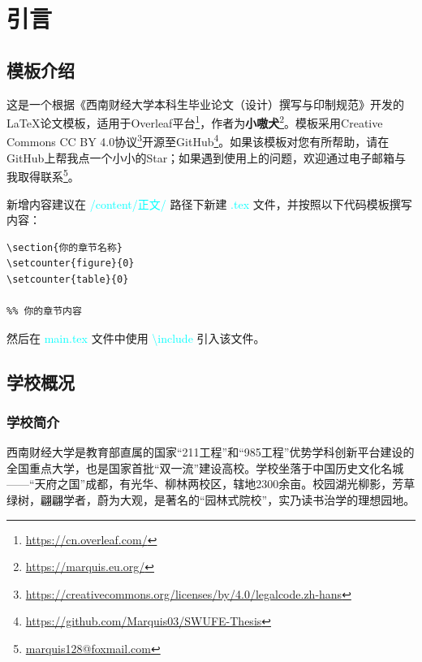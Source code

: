 \setcounter{page}{1}
\section{引言}
\setcounter{figure}{0}
\setcounter{table}{0}

\subsection{模板介绍}

这是一个根据《西南财经大学本科生毕业论文（设计）撰写与印制规范》开发的 \LaTeX 论文模板，适用于Overleaf平台\footnote{\url{https://cn.overleaf.com/}}，作者为\textbf{小嗷犬}\footnote{\url{https://marquis.eu.org/}}。模板采用Creative Commons CC BY 4.0协议\footnote{\url{https://creativecommons.org/licenses/by/4.0/legalcode.zh-hans}}开源至GitHub\footnote{\url{https://github.com/Marquis03/SWUFE-Thesis}}。如果该模板对您有所帮助，请在GitHub上帮我点一个小小的Star；如果遇到使用上的问题，欢迎通过电子邮箱与我取得联系\footnote{\href{mailto:marquis128@foxmail.com}{marquis128@foxmail.com}}。

新增内容建议在 \textcolor{cyan}{/content/正文/} 路径下新建 \textcolor{cyan}{.tex} 文件，并按照以下代码模板撰写内容：

\begin{lstlisting}[language=Tex]
\section{你的章节名称}
\setcounter{figure}{0}
\setcounter{table}{0}

%% 你的章节内容
\end{lstlisting}

然后在 \textcolor{cyan}{main.tex} 文件中使用 \textcolor{cyan}{\textbackslash include} 引入该文件。


\subsection{学校概况}

\subsubsection{学校简介}

西南财经大学是教育部直属的国家“211工程”和“985工程”优势学科创新平台建设的全国重点大学，也是国家首批“双一流”建设高校。学校坐落于中国历史文化名城——“天府之国”成都，有光华、柳林两校区，辖地2300余亩。校园湖光柳影，芳草绿树，翩翩学者，蔚为大观，是著名的“园林式院校”，实乃读书治学的理想园地。

